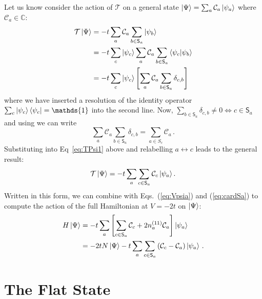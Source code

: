 Let us know consider the action of $\mathcal{T}$ 
    on a general state $\ket{\Psi} = \sum_a \mathcal{C}_a \ket{\psi_a}$ where $\mathcal{C}_a \in \mathds{C}$:
%
\begin{align}
    \mathcal{T}\ket{\Psi} &= -t \sum_a \mathcal{C}_a \sum_{b \in \mathsf{S}_a} \ket{\psi_b} \nonumber \\
                          &= -t \sum_c \ket{\psi_c} \sum_a \mathcal{C}_a
                          \sum_{b \in \mathsf{S}_a} \braket{\psi_c}{\psi_b} \nonumber  \\ 
                          &= -t \sum_c \ket{\psi_c}\left[ \sum_a \mathcal{C}_a
                          \sum_{b \in \mathsf{S}_a} \delta_{c,b}\right] 
    \label{eq:TPsi1}
\end{align}
%
where we have inserted a resolution of the identity operator $\sum_c
\ket{\psi_c}\bra{\psi_c} = \mathds{1}$ into the second line. Now, $\sum_{b \in
\mathsf{S}_a}\delta_{c,b} \ne 0 \iff c \in \mathsf{S}_a$ and using
 we can write
%
\begin{equation}
    \sum_a \mathcal{C}_a \sum_{b \in \mathsf{S}_a} \delta_{c,b} = \sum_{a \in S_c}
    \mathcal{C}_a \, .
\end{equation}
%
Substituting into Eq~\ref{eq:TPsi1} above and relabelling $a \leftrightarrow c$
leads to the general result:
\begin{equation}
    \mathcal{T}\ket{\Psi} = -t \sum_a \sum_{c \in \mathsf{S}_a} \mathcal{C}_c  \ket{\psi_a}.
    \label{eq:TPsi2}
\end{equation}
%
Written in this form, we can combine  with
Eqs.~(\ref{eq:Vpsia}) and (\ref{eq:cardSa}) to compute the action of the full Hamiltonian at $V=-2t$ on $\ket{\Psi}$:
%
\begin{align}
    H \ket{\Psi} &= -t \sum_a \left[\sum_{c \in \mathsf{S}_a} \mathcal{C}_c + 2
    n^{(11)}_a \mathcal{C}_a \right] \ket{\psi_a} \nonumber \\ 
                 &= -2t N \ket{\Psi} - t \sum_a \sum_{c \in \mathsf{S}_a}
                 \qty(\mathcal{C}_c - \mathcal{C}_a)\ket{\psi_a}\, .
\label{eq:HPsi}
\end{align}
%

\section{The Flat State}

